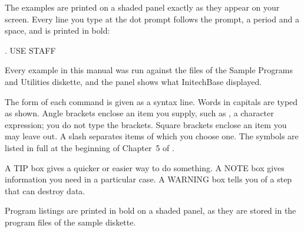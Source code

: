 The examples are printed on a shaded panel exactly as they
appear on your screen.  Every line you type at the dot prompt follows the
prompt, a period and a space, and is printed in bold:
\begin{TypeIn}
. USE STAFF
\end{TypeIn}
Every example in this manual was run against the files of the Sample
Programs and Utilities diskette, and the panel shows what InitechBase
displayed.

The form of each command is given as a syntax line.  Words
in capitals are typed as shown.  Angle brackets enclose an item you supply,
such as , a character expression; you do not type the brackets.
Square brackets enclose an item you may leave out.  A slash separates items
of which you choose one.  The symbols are listed in full at the beginning of
Chapter~5 of .

A TIP box gives a quicker or easier way to do something.  A
NOTE box gives information you need in a particular case.  A WARNING box
tells you of a step that can destroy data.

Program listings are printed in bold on a shaded panel,
as they are stored in the program files of the sample diskette.
